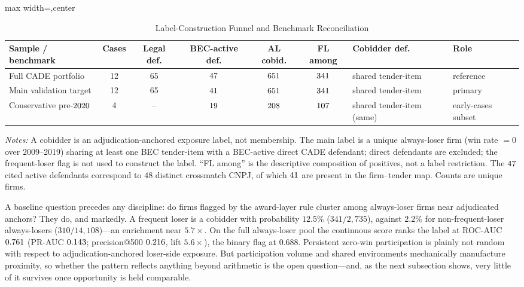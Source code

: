 \begin{table}[htbp]
\centering
\caption{Label-Construction Funnel and Benchmark Reconciliation}
\label{tab:label_funnel_submission}
\scriptsize
\begin{adjustbox}{max width=\textwidth,center}
\begin{threeparttable}
\begin{tabular}{p{3.2cm}cccccp{1.9cm}p{2.6cm}}
\toprule
Sample / benchmark & Cases & Legal def. & BEC-active def. & AL cobid. & FL among & Cobidder def. & Role \\
\midrule
Full CADE portfolio & 12 & 65 & $47$ & $651$ & $341$ & shared tender-item & reference \\
Main validation target & 12 & 65 & $41$ & $651$ & $341$ & shared tender-item & primary \\
Conservative pre-$2020$ & 4 & -- & $19$ & $208$ & $107$ & shared tender-item (same) & early-cases subset \\
\bottomrule
\end{tabular}
\begin{tablenotes}
\scriptsize
\item \textit{Notes:} A cobidder is an adjudication-anchored
exposure label, not membership. The main label is a unique
always-loser firm (win rate $=0$ over 2009--2019) sharing at least
one BEC tender-item with a BEC-active direct CADE defendant;
direct defendants are excluded; the frequent-loser flag is not
used to construct the label. ``FL among'' is the descriptive
composition of positives, not a label restriction. The
$47$ cited active defendants correspond to $48$
distinct crossmatch CNPJ, of which $41$ are
present in the firm--tender map. Counts are unique firms.
\end{tablenotes}
\end{threeparttable}
\end{adjustbox}
\end{table}

A baseline question precedes any discipline: do firms flagged by
the award-layer rule cluster among always-loser firms near
adjudicated anchors? They do, and markedly.
A frequent loser is a cobidder with probability $12.5\%$
($341/2{,}735$), against $2.2\%$ for non-frequent-loser
always-losers ($310/14{,}108$)---an enrichment near $5.7\times$. On
the full always-loser pool the continuous score ranks the label at
ROC-AUC $0.761$ (PR-AUC $0.143$;
precision@500 $0.216$, lift $5.6\times$), the binary flag at
$0.688$. Persistent zero-win participation is plainly not random
with respect to adjudication-anchored loser-side exposure. But
participation volume and shared environments mechanically
manufacture proximity, so whether the pattern reflects anything
beyond arithmetic is the open question---and, as the next
subsection shows, very little of it survives once opportunity is
held comparable.

